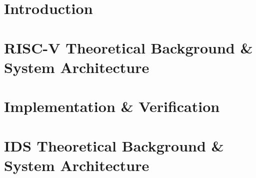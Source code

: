 \documentclass[16pt]{mythesis}
\begin{document}
\maketitle


%











%

\thesisTables










\thesisBodyStart


\chapter{Introduction}


\chapter{RISC-V Theoretical Background \& System Architecture}



\chapter{Implementation \& Verification}



\chapter{IDS Theoretical Background \& System Architecture}

\end{document}
